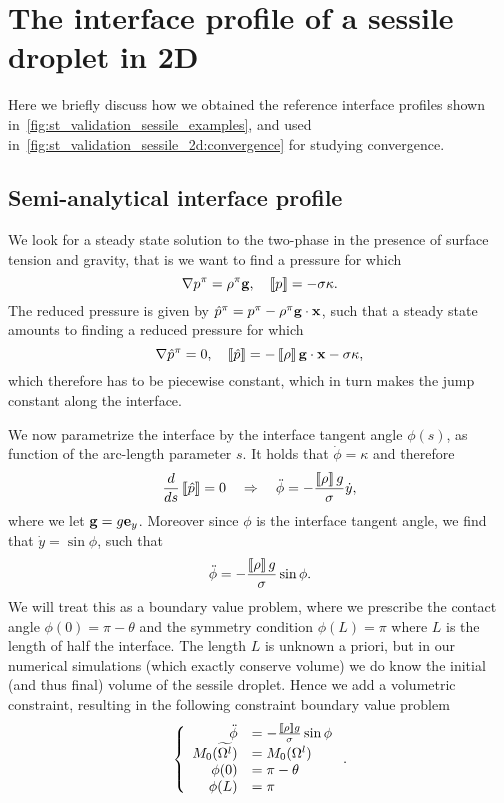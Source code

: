 \section{The interface profile of a sessile droplet in 2D}\label{sec:app:anal:sessile}
Here we briefly discuss how we obtained the reference interface profiles shown in~\cref{fig:st_validation_sessile_examples}, and used in~\cref{fig:st_validation_sessile_2d:convergence} for studying convergence.

\subsection{Semi-analytical interface profile}
We look for a steady state solution to the two-phase \navierstokesequations in the presence of surface tension and gravity, that is we want to find a pressure for which
\begin{equation}
  \nabla p^\pi = \rho^\pi \boldsymbol{\mathbf{g}}, \quad \left\llbracket p\right\rrbracket = -\sigma \kappa.
\end{equation}
The reduced pressure is given by $\hat p^\pi = p^\pi - \rho^\pi \boldsymbol{\mathbf{g}} \cdot \boldsymbol{\mathbf{x}}$, such that a steady state amounts to finding a reduced pressure for which
\begin{equation}
  \nabla \hat p^\pi = 0, \quad \left\llbracket\hat p\right\rrbracket = -\left\llbracket\rho\right\rrbracket \boldsymbol{\mathbf{g}} \cdot \boldsymbol{\mathbf{x}} - \sigma \kappa,
\end{equation}
which therefore has to be piecewise constant, which in turn makes the jump constant along the interface.

We now parametrize the interface by the interface tangent angle $\phi(s)$, as function of the arc-length parameter $s$.
It holds that $\dot{\phi} = \kappa$ and therefore
\begin{equation}
  \frac{d}{ds} \left\llbracket\hat p\right\rrbracket = 0 \quad\Rightarrow\quad \ddot{\phi} = -\frac{\left\llbracket\rho\right\rrbracket g}{\sigma} \dot{y},
\end{equation}
where we let $\boldsymbol{\mathbf{g}} = g \boldsymbol{\mathbf{e}}_y$.
Moreover since $\phi$ is the interface tangent angle, we find that $\dot{y} = \sin\phi$, such that 
\begin{equation}
  \ddot{\phi} = -\frac{\left\llbracket\rho\right\rrbracket g}{\sigma} \sin\phi.
\end{equation}
We will treat this as a boundary value problem, where we prescribe the contact angle $\phi(0) = \pi - \theta$ and the symmetry condition $\phi(L) = \pi$ where $L$ is the length of half the interface.
The length $L$ is unknown a priori, but in our numerical simulations (which exactly conserve volume) we do know the initial (and thus final) volume of the sessile droplet.
Hence we add a volumetric constraint, resulting in the following constraint boundary value problem
\begin{equation}\label{eqn:st:app:sessile:cont}
  \left\lbrace\begin{array}{rl}
    \ddot{\phi} &= -\frac{\left\llbracket\rho\right\rrbracket g}{ \sigma} \sin \phi\\
    M_0(\widetilde{\Omega^{l}}) &= M_0(\Omega^l)\\
    \phi(0) &= \pi - \theta\\
    \phi(L) &= \pi
  \end{array}\right..
\end{equation}

